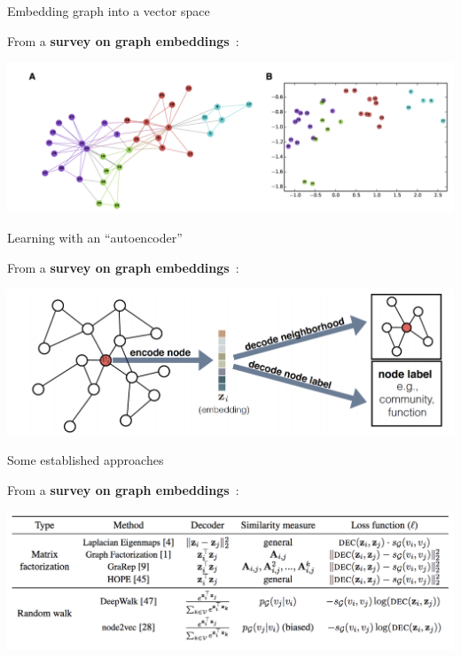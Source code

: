 \begin{frame}{Embedding graph into a vector space}

From a \textbf{survey on graph embeddings}~\cite{hamilton2017representation}:

\begin{center}
	\includegraphics[width=\textwidth]{figures/ge-fig1}
\end{center}

	
\end{frame}



\begin{frame}{Learning with an ``autoencoder''}

From a \textbf{survey on graph embeddings}~\cite{hamilton2017representation}:

\begin{center}
	\includegraphics[width=\textwidth]{figures/ge-fig2}
\end{center}

	
\end{frame}




\begin{frame}{Some established approaches}

From a \textbf{survey on graph embeddings}~\cite{hamilton2017representation}:

\begin{center}
	\includegraphics[width=\textwidth]{figures/ge-fig3}
\end{center}

	
\end{frame}
